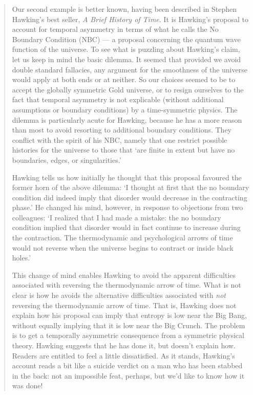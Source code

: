 \documentclass{article}
\begin{document}
\begin{quote}
Our second example is better known, having been described in Stephen
Hawking's best seller, \emph{A Brief History of Time}. It is Hawking's proposal
to account for temporal asymmetry in terms of what he calls the No
Boundary Condition (NBC) --- a proposal concerning the quantum wave
function of the universe. To see what is puzzling about Hawking's claim,
let us keep in mind the basic dilemma. It seemed that provided we avoid
double standard fallacies, any argument for the smoothness of the
universe would apply at both ends or at neither. So our choices seemed
to be to accept the globally symmetric Gold universe, or to resign
ourselves to the fact that temporal asymmetry is not explicable (without
additional assumptions or boundary conditions) by a time-symmetric
physics. The dilemma is particularly acute for Hawking, because he has a
more reason than most to avoid resorting to additional boundary
conditions. They conflict with the spirit of his NBC, namely that one
restrict possible histories for the universe to those that `are finite
in extent but have no boundaries, edges, or singularities.'

Hawking tells us how initially he thought that this proposal favoured
the former horn of the above dilemma: `I thought at first that the no
boundary condition did indeed imply that disorder would decrease in the
contracting phase.' He changed his mind, however, in response to
objections from two colleagues: `I realized that I had made a mistake:
the no boundary condition implied that disorder would in fact continue
to increase during the contraction. The thermodynamic and psychological
arrows of time would not reverse when the universe begins to contract or
inside black holes.'

This change of mind enables Hawking to avoid the apparent difficulties
associated with reversing the thermodynamic arrow of time. What is not
clear is how he avoids the alternative difficulties associated with
\emph{not} reversing the thermodynamic arrow of time. That is, Hawking
does not explain how his proposal can imply that entropy is low near the
Big Bang, without equally implying that it is low near the Big Crunch.
The problem is to get a temporally asymmetric consequence from a
symmetric physical theory. Hawking suggests that he has done it, but
doesn't explain how. Readers are entitled to feel a little dissatisfied.
As it stands, Hawking's account reads a bit like a suicide verdict on a
man who has been stabbed in the back: not an impossible feat, perhaps,
but we'd like to know how it was done!


\end{quote}
\end{document}
